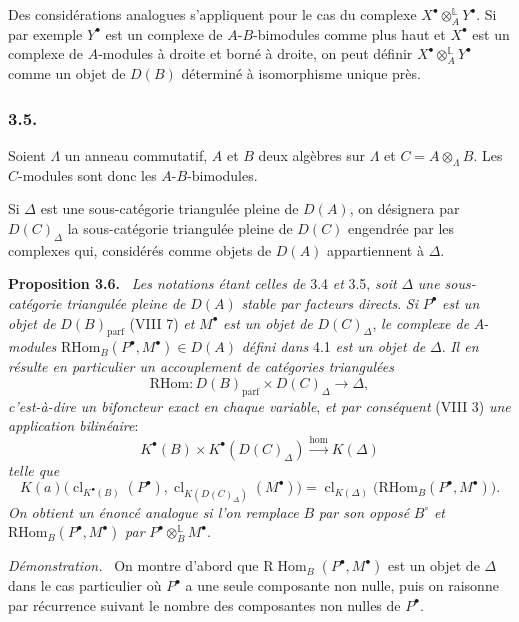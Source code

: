 \documentclass[11pt]{article}
\newenvironment{statement}[1]{\par\medskip\noindent\textbf{#1.}\ }{\par\medskip}
\newenvironment{prooftext}[1][Proof]{\par\noindent\emph{#1.}\ }{\par\medskip}
\DeclareMathOperator{\Hom}{Hom}
\newcommand{\R}{\mathrm{R}}\newcommand{\RHomCore}{\mathrm{RHom}}
\providecommand{\RHom}{\RHomCore}
\providecommand{\cl}{\operatorname{cl}}
\providecommand{\parf}{\mathrm{parf}}
\providecommand{\RHom}{\RHomCore}
\providecommand{\Hom}{\operatorname{Hom}}
\providecommand{\RHom}{\R\mathcal{H}om}
\providecommand{\R}{\mathrm R}
\providecommand{\cl}{\operatorname{cl}}
\providecommand{\parf}{\mathrm{parf}}
\providecommand{\RHom}{\RHomCore}
\providecommand{\Hom}{\operatorname{Hom}}
\providecommand{\cl}{\operatorname{cl}}
\begin{document}
Des considérations analogues s'appliquent pour le cas du complexe $X^\bullet\otimes_A^{\mathbb L}Y^\bullet$. Si par exemple $Y^\bullet$ est un complexe de $A$-$B$-bimodules comme plus haut et $X^\bullet$ est un complexe de $A$-modules à droite et borné à droite, on peut définir $X^\bullet\otimes_A^{\mathbb L}Y^\bullet$ comme un objet de $D(B)$ déterminé à isomorphisme unique près.

\subsubsection*{3.5.}

Soient $\Lambda$ un anneau commutatif, $A$ et $B$ deux algèbres sur $\Lambda$ et
$C=A\otimes_{\Lambda}B$. Les $C$-modules sont donc les $A$-$B$-bimodules.

Si $\Delta$ est une sous-catégorie triangulée pleine de $D(A)$, on désignera par $D(C)_{\Delta}$ la sous-catégorie triangulée pleine de $D(C)$ engendrée par les complexes qui, considérés comme objets de $D(A)$ appartiennent à $\Delta$.

\begin{statement}{Proposition 3.6}
\emph{Les notations étant celles de} 3.4 \emph{et} 3.5, \emph{soit} $\Delta$ \emph{une sous-catégorie triangulée pleine de} $D(A)$ \emph{stable par facteurs directs}. \emph{Si} $P^\bullet$ \emph{est un objet de} $D(B)_{\parf}$ (VIII 7) \emph{et} $M^\bullet$ \emph{est un objet de} $D(C)_{\Delta}$, \emph{le complexe de} $A$-\emph{modules} $\RHom_B(P^\bullet,M^\bullet)\in D(A)$ \emph{défini dans} 4.1 \emph{est un objet de} $\Delta$. \emph{Il en résulte en particulier un accouplement de catégories triangulées}
\[
\RHom:D(B)_{\parf}\times D(C)_{\Delta}\longrightarrow \Delta,
\tag{3.6.1}
\]
\emph{c'est-à-dire un bifoncteur exact en chaque variable}, \emph{et par conséquent} (VIII 3) \emph{une application bilinéaire}:
\[
K^{\bullet}(B)\times K^{\bullet}(D(C)_{\Delta})\xrightarrow{\operatorname{hom}} K(\Delta)
\tag{3.6.2}
\]
\emph{telle que}
\[
K(a)\bigl(\cl_{K^{\bullet}(B)}(P^\bullet),\cl_{K(D(C)_{\Delta})}(M^\bullet)\bigr)
=\cl_{K(\Delta)}\bigl(\RHom_B(P^\bullet,M^\bullet)\bigr).
\tag{3.6.3}
\]
\emph{On obtient un énoncé analogue si l'on remplace} $B$ \emph{par son opposé} $B^\circ$ \emph{et} $\RHom_B(P^\bullet,M^\bullet)$ \emph{par} $P^\bullet\otimes_B^{\mathbb L}M^\bullet$.
\end{statement}

\begin{prooftext}[Démonstration]
On montre d'abord que $\mathrm{R}\Hom_B(P^\bullet,M^\bullet)$ est un objet de $\Delta$ dans le cas particulier où $P^\bullet$ a une seule composante non nulle, puis on raisonne par récurrence suivant le nombre des composantes non nulles de $P^\bullet$.
\end{prooftext}
\end{document}
